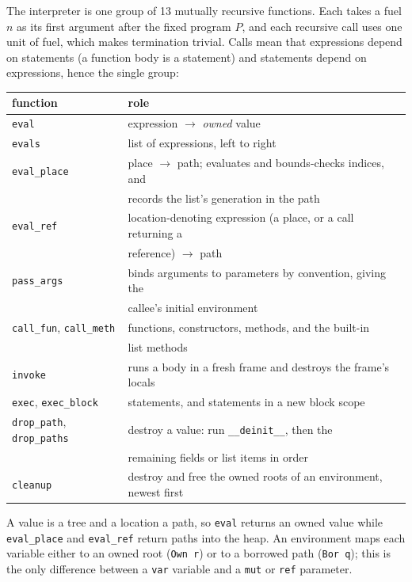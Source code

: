 \documentclass[11pt,a4paper]{article}
\newcommand{\code}[1]{\texttt{#1}}
\begin{document}
The interpreter is one group of 13 mutually recursive functions. Each takes a
fuel $n$ as its first argument after the fixed program $P$, and each recursive
call uses one unit of fuel, which makes termination trivial. Calls mean that
expressions depend on statements (a function body is a statement) and statements
depend on expressions, hence the single group:
\begin{center}\small
\begin{tabular}{@{}ll@{}}
\toprule
function & role\\
\midrule
\code{eval} & expression $\to$ \emph{owned} value\\
\code{evals} & list of expressions, left to right\\
\code{eval\_place} & place $\to$ path; evaluates and bounds-checks indices, and\\
 & records the list's generation in the path\\
\code{eval\_ref} & location-denoting expression (a place, or a call returning a\\
 & reference) $\to$ path\\
\code{pass\_args} & binds arguments to parameters by convention, giving the\\
 & callee's initial environment\\
\code{call\_fun}, \code{call\_meth} & functions, constructors, methods, and the built-in\\
 & list methods\\
\code{invoke} & runs a body in a fresh frame and destroys the frame's locals\\
\code{exec}, \code{exec\_block} & statements, and statements in a new block scope\\
\code{drop\_path}, \code{drop\_paths} & destroy a value: run \code{\_\_deinit\_\_}, then the\\
 & remaining fields or list items in order\\
\code{cleanup} & destroy and free the owned roots of an environment, newest first\\
\bottomrule
\end{tabular}
\end{center}
A value is a tree and a location a path, so \code{eval} returns an owned value
while \code{eval\_place} and \code{eval\_ref} return paths into the heap. An
environment maps each variable either to an owned root (\code{Own r}) or to a
borrowed path (\code{Bor q}); this is the only difference between a \code{var}
variable and a \code{mut} or \code{ref} parameter.
\end{document}
